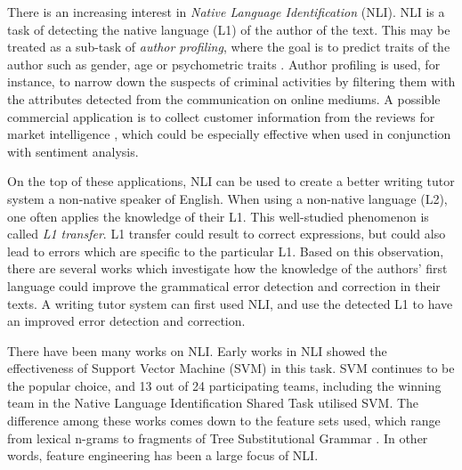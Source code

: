 There is an increasing interest in \emph{Native Language Identification} (NLI).
NLI is a task of detecting the native language (L1) of the author of the text.
This may be treated as a sub-task of \emph{author profiling}, where the goal is to predict traits of the author such as gender, age or psychometric traits  \citep{estival2007author}.
Author profiling is used, for instance, to narrow down the suspects of criminal activities \citep{abbasi2005applying} by filtering them with the attributes detected from the communication on online mediums.
A possible commercial application is to collect customer information from the reviews for market intelligence \citep{glance2005deriving}, which could be especially effective when used in conjunction with sentiment analysis.

On the top of these applications, NLI can be used to create a better writing tutor system a non-native speaker of English.
When using a non-native language (L2), one often applies the knowledge of their L1.
This well-studied phenomenon is called \emph{L1 transfer}\citep{wanner1982language, frenck1997syntactic, dussias2003syntactic, nitschke2010first}.
L1 transfer could result to correct expressions, but could also lead to errors which are specific to the particular L1. 
Based on this observation, there are several works \citep{chang2008automatic, rozovskaya2010generating, rozovskaya2011algorithm, dahlmeier2011correcting} which investigate how the knowledge of the authors' first language could improve the grammatical error detection and correction in their texts.
A writing tutor system can first used NLI, and use the detected L1 to have an improved error detection and correction.

There have been many works on NLI.
Early works in NLI \citep{koppel2005determining, tsur2007using} showed the effectiveness of Support Vector Machine (SVM) in this task.
SVM continues to be the popular choice, and 13 out of 24 participating teams, including the winning team  \citep{jarvis2013maximizing} in the Native Language Identification Shared Task  \citep{tetreault2013report} utilised SVM.
The difference among these works comes down to the feature sets used, which range from lexical n-grams \citep{koppel2005determining, tsur2007using, jarvis2013maximizing} to fragments of Tree Substitutional Grammar  \citep{swanson2012native}.
In other words, feature engineering has been a large focus of NLI.

